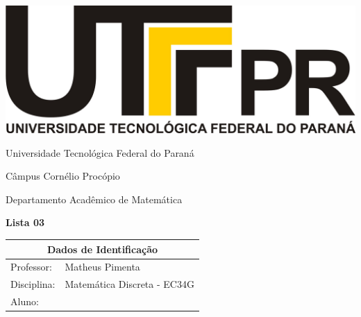 \documentclass[oneside,a4paper,12pt]{article}
\newcommand{\universidade}{Universidade Tecnológica Federal do Paraná}
\newcommand{\centro}{Câmpus Cornélio Procópio}
\newcommand{\departamento}{Departamento Acadêmico de Matemática}
\newcommand{\curso}{Engenharia da Computação}
\newcommand{\professores}{Matheus Pimenta}
\newcommand{\disciplina}{Matemática Discreta - EC34G}
\begin{document}
	\pagestyle{empty}
	
	\begin{center}
		\includegraphics[width=\linewidth/8]{logo.jpg}%
	 	\vspace{2pt} 	
		
		\universidade
		\par
		\centro
		\par
		\departamento
		\par
		\par
		\vspace{12pt}
		\LARGE \textbf{Lista 03}
		
	\end{center}
	
	\vspace{12pt}
	
	\begin{tabular}{ |l|p{12cm}| }
		
		\hline
		\multicolumn{2}{|c|}{\textbf{Dados de Identificação}} \\
		\hline
		Professor:         &    \professores           \\
		\hline
		Disciplina:        &    \disciplina          \\
		\hline
		Aluno:             &                   \\
		\hline
		
	\end{tabular}
	\vspace{6pt}
	
	
	\begin{snugshade}
	\end{snugshade}
\end{document}
